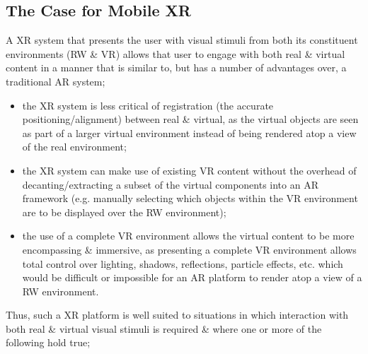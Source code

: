 
\subsection{The Case for Mobile XR}


A XR system that presents the user with visual stimuli from both its constituent environments (RW \& VR) allows that user to engage with both real \& virtual content in a manner that is similar to, but has a number of advantages over, a traditional AR system;

\begin{itemize}
	\item the XR system is less critical of registration (the accurate positioning/alignment) between real \& virtual, as the virtual objects are seen as part of a larger virtual environment instead of being rendered atop a view of the real environment;
	\item the XR system can make use of existing VR content without the overhead of decanting/extracting a subset of the virtual components into an AR framework (e.g. manually selecting which objects within the VR environment are to be displayed over the RW environment);
	\item the use of a complete VR environment allows the virtual content to be more encompassing \& immersive, as presenting a complete VR environment allows total control over lighting, shadows, reflections, particle effects, etc. which would be difficult or impossible for an AR platform to render atop a view of a RW environment.
\end{itemize}

Thus, such a XR platform is well suited to situations in which interaction with both real \& virtual visual stimuli is required \& where one or more of the following hold true;

